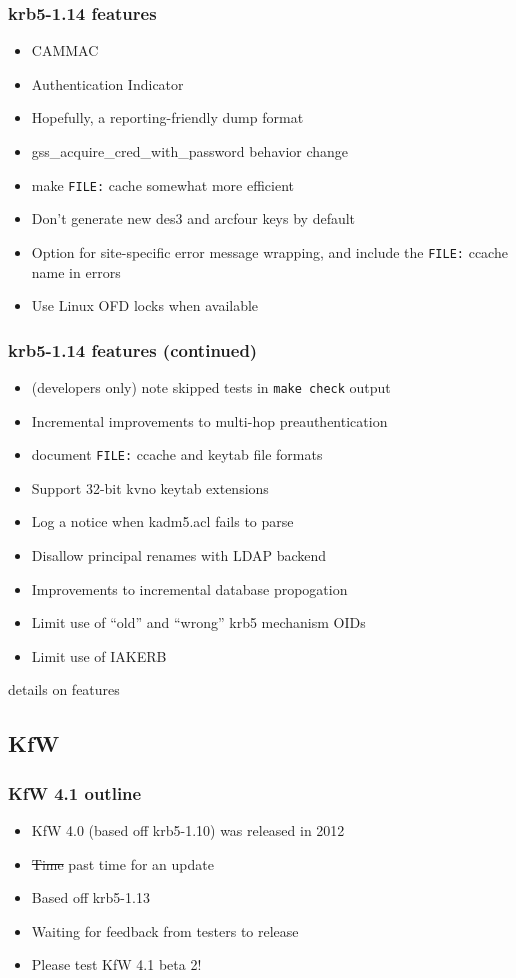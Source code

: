 \documentclass{beamer}
\begin{document}
\begin{frame}[fragile]
\frametitle{krb5-1.14 features}
\begin{itemize}
\item{CAMMAC}
\item{Authentication Indicator}
\item{Hopefully, a reporting-friendly dump format}
\item{gss\_acquire\_cred\_with\_password behavior change}
\item{make \verb+FILE:+ cache somewhat more efficient}
\item{Don't generate new des3 and arcfour keys by default}
\item{Option for site-specific error message wrapping, and include the
	\verb+FILE:+ ccache name in errors}
\item{Use Linux OFD locks when available}
\end{itemize}
\end{frame}
\begin{frame}[fragile]
\frametitle{krb5-1.14 features (continued)}
\begin{itemize}
\item{(developers only) note skipped tests in \verb+make check+ output}
\item{Incremental improvements to multi-hop preauthentication}
\item{document \verb+FILE:+ ccache and keytab file formats}
\item{Support 32-bit kvno keytab extensions}
\item{Log a notice when kadm5.acl fails to parse}
\item{Disallow principal renames with LDAP backend}
\item{Improvements to incremental database propogation}
\item{Limit use of ``old'' and ``wrong'' krb5 mechanism OIDs}
\item{Limit use of IAKERB}
\end{itemize}
\end{frame}

\begin{frame}
details on features
\end{frame}

\subsection{KfW}

\begin{frame}
\frametitle{KfW 4.1 outline}
\begin{itemize}
\item{KfW 4.0 (based off krb5-1.10) was released in 2012}
\item{\sout{Time} past time for an update}
\item{Based off krb5-1.13}
\item{Waiting for feedback from testers to release}
\item{Please test KfW 4.1 beta 2!}
\end{itemize}
\end{frame}
\end{document}
